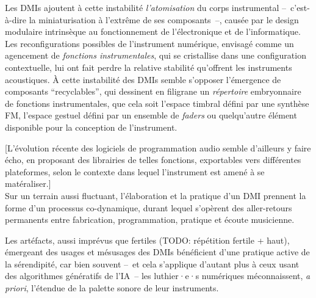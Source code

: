 Les \glspl{DMI} ajoutent à cette instabilité \textit{l'atomisation} du corps instrumental --~c'est-à-dire la miniaturisation à l'extrême de ses composants~--, causée par le design modulaire intrinsèque au fonctionnement de l'électronique et de l'informatique. Les reconfigurations possibles de l'instrument numérique, envisagé comme un agencement de \textit{fonctions instrumentales}, qui se cristallise dans une configuration contextuelle, lui ont fait perdre la relative stabilité qu'offrent les instruments acoustiques. À cette instabilité des \glspl{DMI} semble s'opposer l'émergence de composants ``recyclables'', qui dessinent en filigrane un \textit{répertoire} embryonnaire de fonctions instrumentales, que cela soit l'espace timbral défini par une synthèse FM, l'espace gestuel défini par un ensemble de \textit{faders} ou quelqu'autre élément disponible pour la conception de l'instrument.

[L'évolution récente des logiciels de programmation audio semble d'ailleurs y faire écho, en proposant des librairies de telles fonctions, exportables vers différentes plateformes, selon le contexte dans lequel l'instrument est amené à se matéraliser.]\\
\indent Sur un terrain aussi fluctuant, l'élaboration et la pratique d'un \gls{DMI} prennent la forme d'un processus co-dynamique, durant lequel s'opèrent des aller-retours permanents entre fabrication, programmation, pratique et écoute musicienne.

Les artéfacts, aussi imprévus que fertiles (TODO: répétition fertile + haut), émergeant des usages et mésusages des \glspl{DMI} bénéficient d'une pratique active de la sérendipité, car bien souvent --~et cela s'applique d'autant plus à ceux usant des algorithmes génératifs de l'IA~-- les luthier·e·s numériques méconnaissent, \textit{a priori}, l'étendue de la palette sonore de leur instruments.


